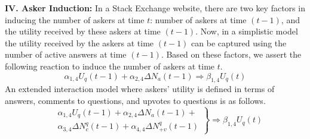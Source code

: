 \indent \textbf{IV. Asker Induction:} In a Stack Exchange website, there are two key factors in inducing the number of askers at time $t$: number of askers at time $(t-1)$, and the utility received by these askers at time $(t-1)$. Now, in a simplistic model the utility received by the askers at time $(t-1)$ can be captured using the number of active answers at time $(t-1)$. Based on these factors, we assert the following reaction to induce the number of askers at time $t$.
\begin{equation*}
\alpha_{1, 4} U_q(t-1) + \alpha_{2, 4} \Delta N_a(t-1) \Longrightarrow \beta_{1, 4} U_q(t)
\end{equation*}
\noindent An extended interaction model where askers' utility is defined in terms of answers, comments to questions, and upvotes to questions is as follows.
\begin{equation*}
\left.
\begin{aligned}
& \alpha_{1, 4} U_q(t-1) + \alpha_{2, 4} \Delta N_a(t-1) +\\
& \alpha_{3, 4} \Delta N_c^q(t-1) + \alpha_{4, 4} \Delta N_{+v}^q(t-1)
\end{aligned}
\right\}
\Longrightarrow \beta_{1, 4} U_q(t)
\end{equation*}

